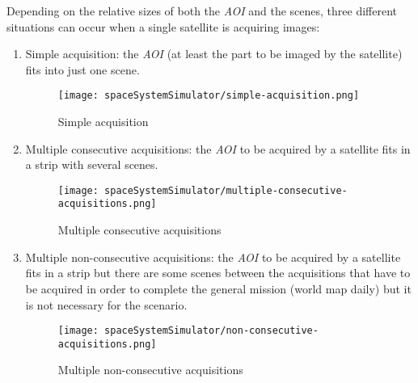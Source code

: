 Depending on the relative sizes of both the \emph{AOI} and the scenes, three different
situations can occur when a single satellite is acquiring images:
\begin{enumerate}
\item Simple acquisition: the \emph{AOI} (at least the part to be imaged by the
  satellite) fits into just one scene.

\begin{figure}[!h]
\begin{center}
\texttt{[image: spaceSystemSimulator/simple-acquisition.png]}
\caption{Simple acquisition}
\label{fig:sss-simple-acquisition}
\end{center}
\end{figure}
\item Multiple consecutive acquisitions: the \emph{AOI} to be acquired by a satellite
fits in a strip with several scenes.
\begin{figure}[!h]
\begin{center}
\texttt{[image: spaceSystemSimulator/multiple-consecutive-acquisitions.png]}
\caption{Multiple consecutive acquisitions}
\label{fig:sss-multiple-acquisition-diagram}
\end{center}
\end{figure}

\item Multiple non-consecutive acquisitions: the \emph{AOI} to be acquired by a
  satellite fits in a strip but there are some scenes between the acquisitions
  that have to be acquired in order to complete the general mission (world map
  daily) but it is not necessary for the scenario.

\begin{figure}[!h]
\begin{center}
\texttt{[image: spaceSystemSimulator/non-consecutive-acquisitions.png]}
\caption{Multiple non-consecutive acquisitions}
\label{fig:sss-non-consecutive-acquisition}
\end{center}
\end{figure}

\end{enumerate}



